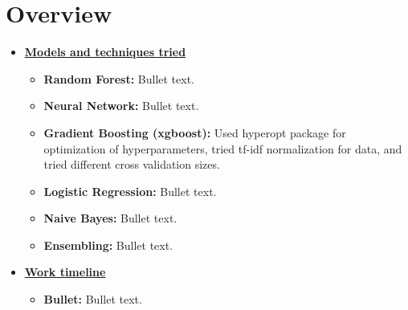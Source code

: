 \documentclass[11pt]{article}
\newcommand{\boldline}[1]{\underline{\textbf{#1}}}
\begin{document}
	\section{Overview}
	\medskip
	\begin{itemize}
		
		\item \boldline{Models and techniques tried}
		\begin{itemize}
			\item \textbf{Random Forest:} Bullet text.
			\item \textbf{Neural Network:} Bullet text.
			\item \textbf{Gradient Boosting (xgboost):} Used hyperopt package for optimization of hyperparameters, tried tf-idf normalization for data, and tried different cross validation sizes.
			\item \textbf{Logistic Regression:} Bullet text.
			\item \textbf{Naive Bayes:} Bullet text.
			\item \textbf{Ensembling:} Bullet text.
		\end{itemize}
		
		\item \boldline{Work timeline}
		\begin{itemize}
			\item \textbf{Bullet:} Bullet text.
		\end{itemize}
		
	\end{itemize}
	
	
	
\end{document}
